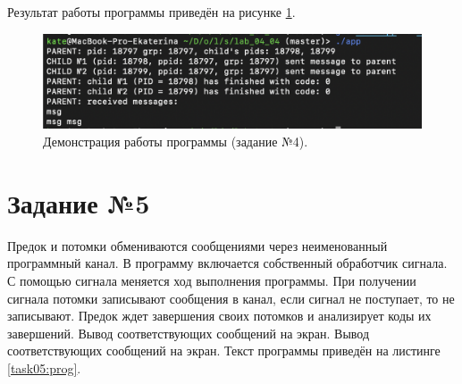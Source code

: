 \documentclass[12pt]{report}
\begin{document}
Результат работы программы приведён на рисунке \ref{task04:demo}. 
\begin{figure}[H]

	\centering

	\includegraphics[width=\linewidth]{task04.png}
	\caption{Демонстрация работы программы (задание №4).}

	\label{task04:demo}

\end{figure}
\newpage
\section*{Задание №5}
Предок и потомки обмениваются сообщениями через неименованный программный канал. В программу включается собственный обработчик сигнала. С помощью сигнала меняется ход выполнения программы. При получении сигнала потомки записывают сообщения в канал, если сигнал не поступает, то не записывают. Предок ждет завершения своих потомков и анализирует коды их завершений. Вывод соответствующих сообщений на экран. Вывод соответствующих сообщений на экран. Текст программы приведён на листинге \ref{task05:prog}.
\end{document}
